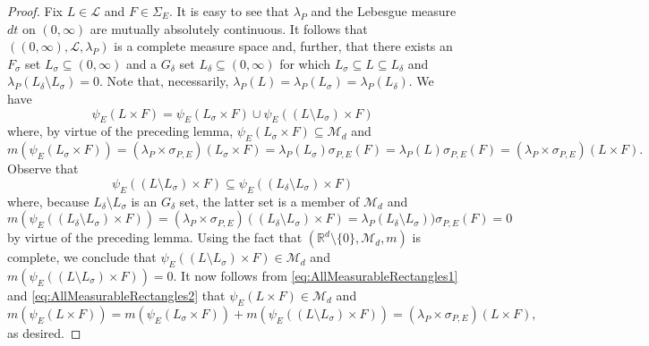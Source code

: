 \documentclass[11pt]{article}
\begin{document}
\begin{proof}
Fix $L\in\mathcal{L}$ and $F\in\Sigma_E$. It is easy to see that $\lambda_P$ and the Lebesgue measure $dt$ on $(0,\infty)$ are mutually absolutely continuous. It follows that $((0,\infty), \mathcal{L},\lambda_P)$ is a complete measure space and, further, that there exists an $F_\sigma$ set $L_\sigma\subseteq (0,\infty)$ and a $G_\delta$ set $L_\delta\subseteq (0,\infty)$ for which $L_\sigma\subseteq L\subseteq L_\delta$ and $\lambda_P(L_\delta\setminus L_\sigma)=0$. Note that, necessarily, $\lambda_P(L)=\lambda_P(L_\sigma)=\lambda_P(L_\delta)$. We have
\begin{equation}\label{eq:AllMeasurableRectangles1}
\psi_E(L\times F)=\psi_E( L_\sigma\times F)\cup\psi_E((L\setminus L_\sigma)\times F)
\end{equation}
where, by virtue of the preceding lemma, $\psi_E(L_\sigma\times F)\subseteq \mathcal{M}_d$ and
\begin{equation}\label{eq:AllMeasurableRectangles2}
m(\psi_E(L_{\sigma}\times F))=(\lambda_P\times\sigma_{P,E})( L_\sigma\times F)=\lambda_P(L_\sigma)\sigma_{P,E}(F)=\lambda_P(L)\sigma_{P,E}(F)=(\lambda_P\times\sigma_{P,E})(L\times F).
\end{equation}
Observe that
\begin{equation*}
\psi_E((L\setminus L_\sigma)\times F)\subseteq \psi_E((L_{\delta}\setminus L_\sigma)\times F)
\end{equation*}
where, because $L_\delta\setminus L_\sigma$ is an $G_{\delta}$ set, the latter set is a member of $\mathcal{M}_d$ and
\begin{equation*}
m(\psi_E((L_\delta\setminus L_\sigma)\times F))=(\lambda_P\times\sigma_{P,E})((L_\delta\setminus L_\sigma)\times F)=\lambda_P(L_\delta\setminus L_\sigma))\sigma_{P,E}(F)=0
\end{equation*}
by virtue of the preceding lemma. Using the fact that $(\mathbb{R}^d\setminus\{0\},\mathcal{M}_d,m)$ is complete, we conclude that $\psi_E((L\setminus L_\sigma)\times F)\in \mathcal{M}_d$ and $m(\psi_E((L\setminus L_\sigma)\times F))=0$. It now follows from \eqref{eq:AllMeasurableRectangles1} and \eqref{eq:AllMeasurableRectangles2} that $\psi_E(L\times F)\in\mathcal{M}_d$ and
\begin{equation*}
m(\psi_E(L\times F))=m(\psi_E(L_\sigma\times F))+m(\psi_E((L\setminus L_\sigma)\times F))=(\lambda_P\times\sigma_{P,E})(L\times F),
\end{equation*}
as desired.
\end{proof}
\end{document}
